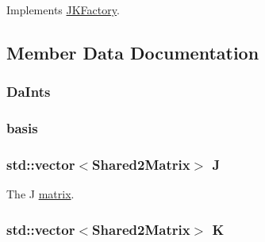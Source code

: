 Implements \hyperlink{classJKBuilder_1_1JKFactory_ae253b309dafe3ce003fdabfd315318b8}{JKFactory}.

\subsection{Member Data Documentation}
\hypertarget{classJKBuilder_1_1PsiShared_abff505bf91f526e978bc6abbf3e0cfc5}{
\subsubsection[{DaInts}]{ {\bf DaInts}}}
\label{classJKBuilder_1_1PsiShared_abff505bf91f526e978bc6abbf3e0cfc5}
\hypertarget{classJKBuilder_1_1PsiShared_a33250ff04c740919f41b0ffb6c78ada5}{
\subsubsection[{basis}]{ {\bf basis}}}
\label{classJKBuilder_1_1PsiShared_a33250ff04c740919f41b0ffb6c78ada5}
\hypertarget{classJKBuilder_1_1SharedFactory_afabc3015deddc9247c1c2822431a724f}{
\subsubsection[{J}]{\setlength{\rightskip}{0pt plus 5cm}std::vector$<${\bf Shared2Matrix}$>$ {\bf J}}}
\label{classJKBuilder_1_1SharedFactory_afabc3015deddc9247c1c2822431a724f}


The J \hyperlink{classJKBuilder_1_1matrix}{matrix}. \hypertarget{classJKBuilder_1_1SharedFactory_a59469c5d5576ee51c033626879e699b1}{
\subsubsection[{K}]{\setlength{\rightskip}{0pt plus 5cm}std::vector$<${\bf Shared2Matrix}$>$ {\bf K}}}
\label{classJKBuilder_1_1SharedFactory_a59469c5d5576ee51c033626879e699b1}


